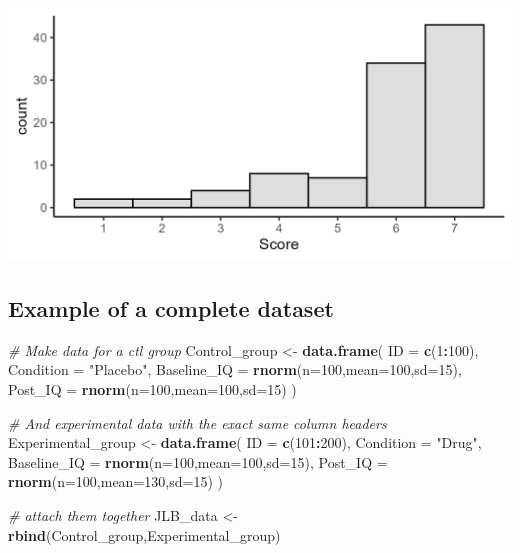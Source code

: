 \documentclass[
]{book}
\newenvironment{Shaded}{\begin{snugshade}}{\end{snugshade}}
\newcommand{\AttributeTok}[1]{\textcolor[rgb]{0.13,0.29,0.53}{#1}}
\newcommand{\CommentTok}[1]{\textcolor[rgb]{0.56,0.35,0.01}{\textit{#1}}}
\newcommand{\DecValTok}[1]{\textcolor[rgb]{0.00,0.00,0.81}{#1}}
\newcommand{\FunctionTok}[1]{\textcolor[rgb]{0.13,0.29,0.53}{\textbf{#1}}}
\newcommand{\NormalTok}[1]{#1}
\newcommand{\OtherTok}[1]{\textcolor[rgb]{0.56,0.35,0.01}{#1}}
\newcommand{\SpecialCharTok}[1]{\textcolor[rgb]{0.81,0.36,0.00}{\textbf{#1}}}
\newcommand{\StringTok}[1]{\textcolor[rgb]{0.31,0.60,0.02}{#1}}
\begin{document}
\includegraphics[width=20.83in]{Figs/hist_3}

\subsection*{Example of a complete dataset}\label{example-of-a-complete-dataset}

\begin{Shaded}
\begin{Highlighting}[]
\CommentTok{\# Make data for a ctl group}
\NormalTok{Control\_group }\OtherTok{\textless{}{-}} \FunctionTok{data.frame}\NormalTok{(}
  \AttributeTok{ID =} \FunctionTok{c}\NormalTok{(}\DecValTok{1}\SpecialCharTok{:}\DecValTok{100}\NormalTok{),}
  \AttributeTok{Condition =} \StringTok{"Placebo"}\NormalTok{,}
  \AttributeTok{Baseline\_IQ =} \FunctionTok{rnorm}\NormalTok{(}\AttributeTok{n=}\DecValTok{100}\NormalTok{,}\AttributeTok{mean=}\DecValTok{100}\NormalTok{,}\AttributeTok{sd=}\DecValTok{15}\NormalTok{),}
  \AttributeTok{Post\_IQ =} \FunctionTok{rnorm}\NormalTok{(}\AttributeTok{n=}\DecValTok{100}\NormalTok{,}\AttributeTok{mean=}\DecValTok{100}\NormalTok{,}\AttributeTok{sd=}\DecValTok{15}\NormalTok{)}
\NormalTok{)}

\CommentTok{\# And experimental data with the exact same column headers}
\NormalTok{Experimental\_group }\OtherTok{\textless{}{-}} \FunctionTok{data.frame}\NormalTok{(}
  \AttributeTok{ID =} \FunctionTok{c}\NormalTok{(}\DecValTok{101}\SpecialCharTok{:}\DecValTok{200}\NormalTok{),}
  \AttributeTok{Condition =} \StringTok{"Drug"}\NormalTok{,}
  \AttributeTok{Baseline\_IQ =} \FunctionTok{rnorm}\NormalTok{(}\AttributeTok{n=}\DecValTok{100}\NormalTok{,}\AttributeTok{mean=}\DecValTok{100}\NormalTok{,}\AttributeTok{sd=}\DecValTok{15}\NormalTok{),}
  \AttributeTok{Post\_IQ =} \FunctionTok{rnorm}\NormalTok{(}\AttributeTok{n=}\DecValTok{100}\NormalTok{,}\AttributeTok{mean=}\DecValTok{130}\NormalTok{,}\AttributeTok{sd=}\DecValTok{15}\NormalTok{)}
\NormalTok{)}

\CommentTok{\# attach them together}
\NormalTok{JLB\_data }\OtherTok{\textless{}{-}} \FunctionTok{rbind}\NormalTok{(Control\_group,Experimental\_group)}
\end{Highlighting}
\end{Shaded}
\end{document}
